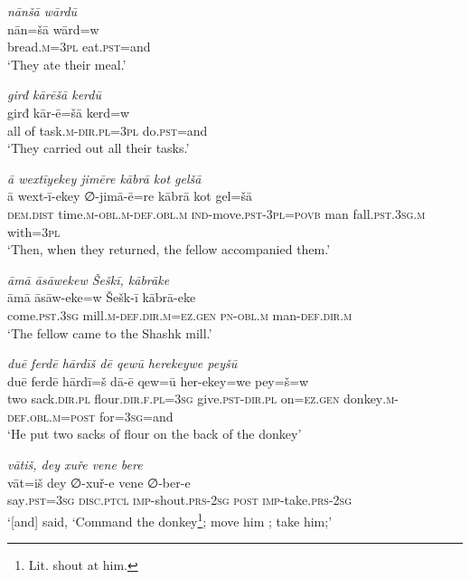 \ea \label{HB.57}
\textit{nānšā wārdū} \\ 
\gll nān=šā wārd=w \\ 
 bread\textsc{.m}\textsc{=3pl} eat\textsc{.pst}=and \\ 
\glt `They ate their meal.'
\z 
 
\ea \label{HB.58}
\textit{girđ kārēšā kerdū} \\ 
\gll girđ kār-ē=šā kerd=w \\ 
 all of task\textsc{.m}\textsc{-dir}\textsc{.pl}\textsc{=3pl} do\textsc{.pst}=and \\ 
\glt `They carried out all their tasks.'
\z 
 
\ea \label{HB.59}
\textit{ā wextīyekey jimēre kābrā kot gelšā} \\ 
\gll ā wext-ī-ekey ∅-jimā-ē=re kābrā kot gel=šā \\ 
 \textsc{dem.dist} time\textsc{.m}\textsc{-obl}\textsc{.m}\textsc{-def}\textsc{.obl}\textsc{.m} \textsc{ind-}move\textsc{.pst}\textsc{-3pl}\textsc{=\textsc{povb}} man fall\textsc{.pst}\textsc{.3sg}\textsc{.m} with\textsc{=3pl} \\ 
\glt `Then, when they returned, the fellow accompanied them.'
\z 
 
\ea \label{HB.60}
\textit{āmā āsāwekew Šeškī, kābrāke} \\ 
\gll āmā āsāw-eke=w Šešk-ī kābrā-eke \\ 
 come\textsc{.pst}\textsc{.3sg} mill\textsc{.m}\textsc{-def}\textsc{.dir}\textsc{.m}\textsc{=ez}\textsc{.gen} \textsc{pn}\textsc{-obl}\textsc{.m} man\textsc{-def}\textsc{.dir}\textsc{.m} \\ 
\glt `The fellow came to the Shashk mill.'
\z 
 
\ea \label{HB.61}
\textit{duē ferdē hārdīš dē qewū herekeywe peyšū} \\ 
\gll duē ferdē hārdī=š dā-ē qew=ū her-ekey=we pey=š=w \\ 
 two sack\textsc{.dir}\textsc{.pl} flour\textsc{.dir}\textsc{\textsc{.f}}\textsc{.pl}\textsc{=3sg} give\textsc{.pst}\textsc{-dir}\textsc{.pl} on\textsc{=ez}\textsc{.gen} donkey\textsc{.m}\textsc{-def}\textsc{.obl}\textsc{.m}\textsc{=\textsc{post}} for\textsc{=3sg}=and \\ 
\glt `He put two sacks of flour on the back of the donkey'
\z 
 
\ea \label{HB.62}
\textit{vātiš, dey xuře vene bere} \\ 
\gll vāt=iš dey ∅-xuř-e vene ∅-ber-e \\ 
 say\textsc{.pst}\textsc{=3sg} \textsc{disc.ptcl} \textsc{imp-}shout\textsc{.prs}-\textsc{2sg} \textsc{post} \textsc{imp-}take\textsc{.prs}-\textsc{2sg} \\ 
\glt `[and] said, ‘Command the donkey\footnote{Lit. shout at him.}; move him ; take him;'
\z 
 
